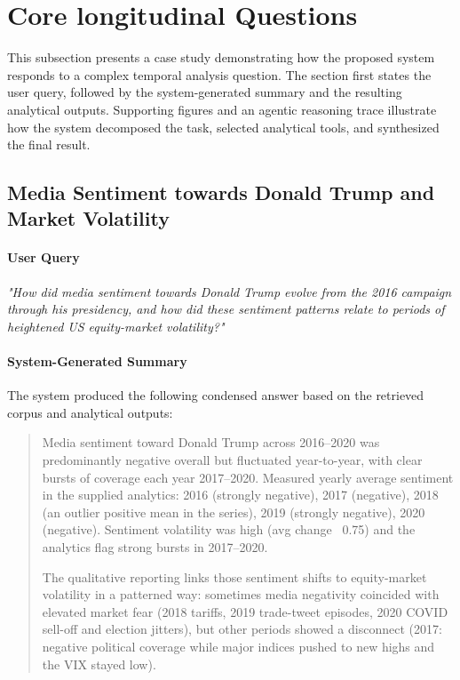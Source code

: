 \section{Core longitudinal Questions}

This subsection presents a case study demonstrating how the proposed system responds to a complex temporal analysis question. The section first states the user query, followed by the system-generated summary and the resulting analytical outputs. Supporting figures and an agentic reasoning trace illustrate how the system decomposed the task, selected analytical tools, and synthesized the final result.

\subsection{Media Sentiment towards Donald Trump and Market Volatility}

\paragraph{User Query}

\textit{"How did media sentiment towards Donald Trump evolve from the 2016 campaign through his presidency, and how did these sentiment patterns relate to periods of heightened US equity-market volatility?"}

\paragraph{System-Generated Summary}
The system produced the following condensed answer based on the retrieved corpus and analytical outputs:

\begin{quote}
Media sentiment toward Donald Trump across 2016–2020 was predominantly negative overall but fluctuated year-to-year, with clear bursts of coverage each year 2017–2020. Measured yearly average sentiment in the supplied analytics: 2016 (strongly negative), 2017 (negative), 2018 (an outlier positive mean in the series), 2019 (strongly negative), 2020 (negative). Sentiment volatility was high (avg change ~0.75) and the analytics flag strong bursts in 2017–2020.

The qualitative reporting links those sentiment shifts to equity-market volatility in a patterned way: sometimes media negativity coincided with elevated market fear (2018 tariffs, 2019 trade-tweet episodes, 2020 COVID sell-off and election jitters), but other periods showed a disconnect (2017: negative political coverage while major indices pushed to new highs and the VIX stayed low).
\end{quote}

